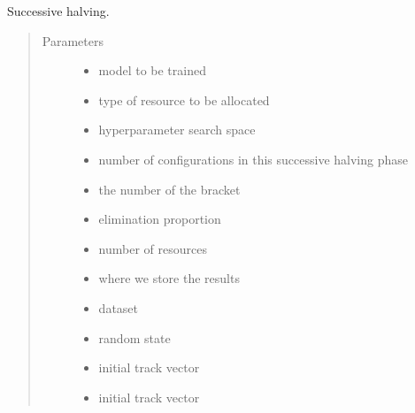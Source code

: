\documentclass[letterpaper,10pt,english]{sphinxmanual}
\begin{document}
\begin{fulllineitems}
\label{\detokenize{index:hyperband.hyperband_finite.sh_finite}}
Successive halving.
\begin{quote}\begin{description}
\item[{Parameters}] \leavevmode\begin{itemize}
\item {} 
 \textendash{} model to be trained

\item {} 
 \textendash{} type of resource to be allocated

\item {} 
 \textendash{} hyperparameter search space

\item {} 
 \textendash{} number of configurations in this successive halving phase

\item {} 
 \textendash{} the number of the bracket

\item {} 
 \textendash{} elimination proportion

\item {} 
 \textendash{} number of resources

\item {} 
 \textendash{} where we store the results

\item {} 
 \textendash{} dataset

\item {} 
 \textendash{} random state

\item {} 
 \textendash{} initial track vector

\item {} 
 \textendash{} initial track vector


\end{itemize}
\end{description}
\end{quote}
\end{fulllineitems}
\end{document}
